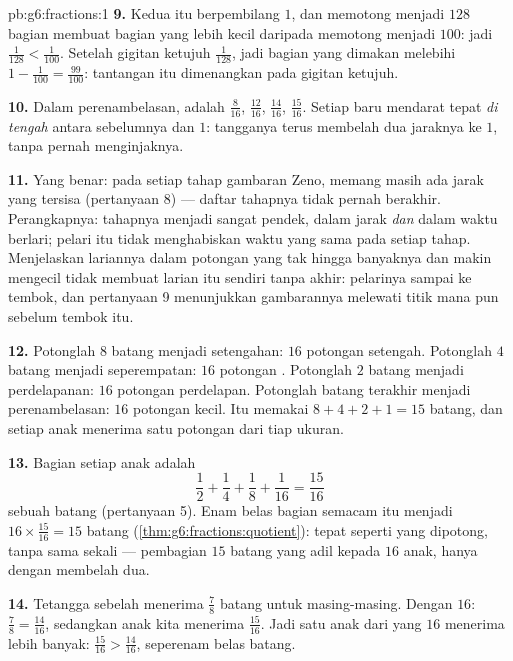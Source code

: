 \begin{solution}{pb:g6:fractions:1}
\textbf{9.} Kedua  itu berpembilang $1$, dan memotong menjadi
$128$ bagian membuat bagian yang lebih kecil daripada memotong menjadi
$100$: jadi $\frac{1}{128} < \frac{1}{100}$. Setelah gigitan ketujuh
 $\frac{1}{128}$, jadi bagian yang dimakan melebihi
$1 - \frac{1}{100} = \frac{99}{100}$: tantangan itu dimenangkan pada
gigitan ketujuh.

\textbf{10.} Dalam perenambelasan,  adalah $\frac{8}{16}$,
$\frac{12}{16}$, $\frac{14}{16}$, $\frac{15}{16}$. Setiap  baru
mendarat tepat \emph{di tengah} antara  sebelumnya dan $1$:
tangganya terus membelah dua  jaraknya ke $1$, tanpa pernah
menginjaknya.

\textbf{11.} Yang benar: pada setiap tahap gambaran Zeno, memang masih
ada jarak yang tersisa (pertanyaan 8) --- daftar tahapnya tidak pernah
berakhir. Perangkapnya: tahapnya menjadi sangat pendek, dalam jarak
\emph{dan} dalam waktu berlari; pelari itu tidak menghabiskan waktu
yang sama pada setiap tahap. Menjelaskan lariannya dalam potongan yang
tak hingga banyaknya dan makin mengecil tidak membuat larian itu
sendiri tanpa akhir: pelarinya sampai ke tembok, dan pertanyaan 9
menunjukkan gambarannya melewati titik mana pun sebelum tembok itu.

\textbf{12.} Potonglah $8$ batang menjadi setengahan: $16$ potongan
setengah. Potonglah $4$ batang menjadi seperempatan: $16$ potongan
. Potonglah $2$ batang menjadi perdelapanan: $16$ potongan
perdelapan. Potonglah batang terakhir menjadi perenambelasan: $16$
potongan kecil. Itu memakai $8 + 4 + 2 + 1 = 15$ batang, dan setiap
anak menerima satu potongan dari tiap ukuran.

\textbf{13.} Bagian setiap anak adalah
\[
\frac12 + \frac14 + \frac18 + \frac{1}{16} = \frac{15}{16}
\]
sebuah batang (pertanyaan 5). Enam belas bagian semacam itu menjadi
$16 \times \frac{15}{16} = 15$ batang
(\cref{thm:g6:fractions:quotient}): tepat seperti yang dipotong, tanpa
 sama sekali --- pembagian $15$ batang yang adil kepada $16$ anak,
hanya dengan membelah dua.

\textbf{14.} Tetangga sebelah menerima $\frac78$ batang untuk
masing-masing. Dengan  $16$: $\frac78 = \frac{14}{16}$,
sedangkan anak kita menerima $\frac{15}{16}$. Jadi satu anak dari yang
$16$ menerima lebih banyak: $\frac{15}{16} > \frac{14}{16}$, 
seperenam belas batang.


\end{solution}
